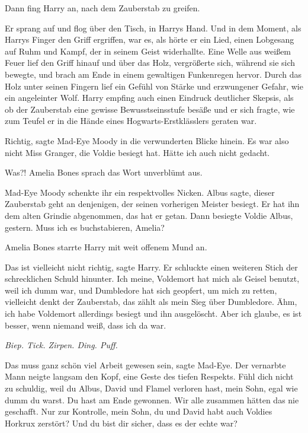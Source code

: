 Dann fing Harry an, nach dem Zauberstab zu greifen.

Er sprang auf und flog über den Tisch, in Harrys Hand. Und in dem Moment, als
Harrys Finger den Griff ergriffen, war es, als hörte er ein Lied, einen
Lobgesang auf Ruhm und Kampf, der in seinem Geist widerhallte. Eine Welle aus
weißem Feuer lief den Griff hinauf und über das Holz, vergrößerte sich, während
sie sich bewegte, und brach am Ende in einem gewaltigen Funkenregen hervor.
Durch das Holz unter seinen Fingern lief ein Gefühl von Stärke und erzwungener
Gefahr, wie ein angeleinter Wolf. Harry empfing auch einen Eindruck deutlicher
Skepsis, als ob der Zauberstab eine gewisse Bewusstseinsstufe besäße und er sich
fragte, wie zum Teufel er in die Hände eines Hogwarts-Erstklässlers geraten war.

\glqq{}Richtig\grqq{}, sagte Mad-Eye Moody in die verwunderten Blicke hinein.
\glqq{}Es war also nicht Miss Granger, die Voldie besiegt hat. Hätte ich auch
nicht gedacht.\grqq{}

\glqq{}Was?!\grqq{} Amelia Bones sprach das Wort unverblümt aus.

Mad-Eye Moody schenkte ihr ein respektvolles Nicken. \glqq{}Albus sagte, dieser
Zauberstab geht an denjenigen, der seinen vorherigen Meister besiegt. Er hat ihn
dem alten Grindie abgenommen, das hat er getan. Dann besiegte Voldie Albus,
gestern. Muss ich es buchstabieren, Amelia?\grqq{}

Amelia Bones starrte Harry mit weit offenem Mund an.

\glqq{}Das ist vielleicht nicht richtig\grqq{}, sagte Harry. Er schluckte einen
weiteren Stich der schrecklichen Schuld hinunter. \glqq{}Ich meine, Voldemort hat
mich als Geisel benutzt, weil ich dumm war, und Dumbledore hat sich geopfert, um
mich zu retten, vielleicht denkt der Zauberstab, das zählt als mein Sieg über
Dumbledore. Ähm, ich habe Voldemort allerdings besiegt und ihn ausgelöscht. Aber
ich glaube, es ist besser, wenn niemand weiß, dass ich da war.\grqq{}

\emph{Biep. Tick. Zirpen. Ding. Puff.}

\glqq{}Das muss ganz schön viel Arbeit gewesen sein\grqq{}, sagte Mad-Eye. Der
vernarbte Mann neigte langsam den Kopf, eine Geste des tiefen Respekts. \glqq{}
Fühl dich nicht zu schuldig, weil du Albus, David und Flamel verloren hast, mein
Sohn, egal wie dumm du warst. Du hast am Ende gewonnen. Wir alle zusammen hätten
das nie geschafft. Nur zur Kontrolle, mein Sohn, du und David habt auch Voldies
Horkrux zerstört? Und du bist dir sicher, dass es der echte war?\grqq{}

